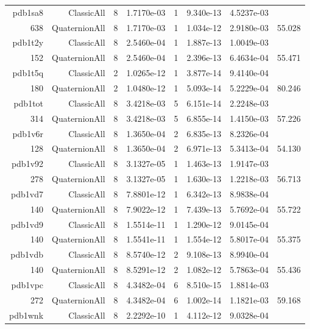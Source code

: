 \begin{xltabular}{\textwidth}{r|rcS[table-format=1.4e+2]cS[table-format=1.3e+2]S[table-format=1.4e+2]S[table-format=-1.3]}
pdb1sa8 & ClassicAll & 8 & 1.7170e-03 & 1 & 9.340e-13 & 4.5237e-03 & \\
638 & QuaternionAll & 8 & 1.7170e-03 & 1 & 1.034e-12 & 2.9180e-03 & 55.028\\  \addlinespace
pdb1t2y & ClassicAll & 8 & 2.5460e-04 & 1 & 1.887e-13 & 1.0049e-03 & \\
152 & QuaternionAll & 8 & 2.5460e-04 & 1 & 2.396e-13 & 6.4634e-04 & 55.471\\  \addlinespace
pdb1t5q & ClassicAll & 2 & 1.0265e-12 & 1 & 3.877e-14 & 9.4140e-04 & \\
180 & QuaternionAll & 2 & 1.0480e-12 & 1 & 5.093e-14 & 5.2229e-04 & 80.246\\  \addlinespace
pdb1tot & ClassicAll & 8 & 3.4218e-03 & 5 & 6.151e-14 & 2.2248e-03 & \\
314 & QuaternionAll & 8 & 3.4218e-03 & 5 & 6.855e-14 & 1.4150e-03 & 57.226\\  \addlinespace
pdb1v6r & ClassicAll & 8 & 1.3650e-04 & 2 & 6.835e-13 & 8.2326e-04 & \\
128 & QuaternionAll & 8 & 1.3650e-04 & 2 & 6.971e-13 & 5.3413e-04 & 54.130\\  \addlinespace
pdb1v92 & ClassicAll & 8 & 3.1327e-05 & 1 & 1.463e-13 & 1.9147e-03 & \\
278 & QuaternionAll & 8 & 3.1327e-05 & 1 & 1.630e-13 & 1.2218e-03 & 56.713\\  \addlinespace
pdb1vd7 & ClassicAll & 8 & 7.8801e-12 & 1 & 6.342e-13 & 8.9838e-04 & \\
140 & QuaternionAll & 8 & 7.9022e-12 & 1 & 7.439e-13 & 5.7692e-04 & 55.722\\  \addlinespace
pdb1vd9 & ClassicAll & 8 & 1.5514e-11 & 1 & 1.290e-12 & 9.0145e-04 & \\
140 & QuaternionAll & 8 & 1.5541e-11 & 1 & 1.554e-12 & 5.8017e-04 & 55.375\\  \addlinespace
pdb1vdb & ClassicAll & 8 & 8.5740e-12 & 2 & 9.108e-13 & 8.9940e-04 & \\
140 & QuaternionAll & 8 & 8.5291e-12 & 2 & 1.082e-12 & 5.7863e-04 & 55.436\\  \addlinespace
pdb1vpc & ClassicAll & 8 & 4.3482e-04 & 6 & 8.510e-15 & 1.8814e-03 & \\
272 & QuaternionAll & 8 & 4.3482e-04 & 6 & 1.002e-14 & 1.1821e-03 & 59.168\\  \addlinespace
pdb1wnk & ClassicAll & 8 & 2.2292e-10 & 1 & 4.112e-12 & 9.0328e-04 & \\

\end{xltabular}
